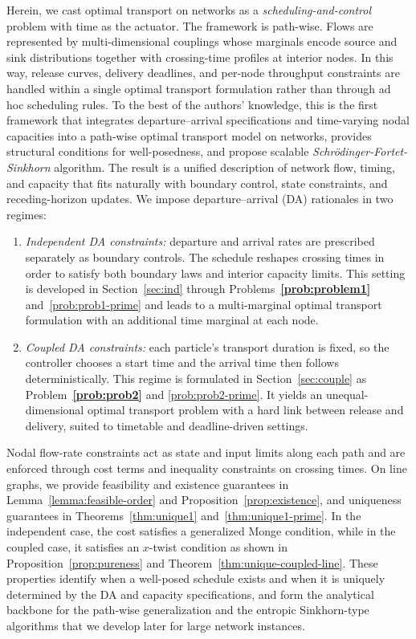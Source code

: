 \documentclass[11pt]{article}
\begin{document}
Herein, we cast optimal transport on networks as a \emph{scheduling-and-control} problem with time as the actuator. The framework is path-wise. Flows are represented by multi-dimensional couplings whose marginals encode source and sink distributions together with crossing-time profiles at interior nodes. In this way, release curves, delivery deadlines, and per-node throughput constraints are handled within a single optimal transport formulation rather than through ad hoc scheduling rules. To the best of the authors’ knowledge, this is the first framework that integrates departure–arrival specifications and time-varying nodal capacities into a path-wise optimal transport model on networks, provides structural conditions for well-posedness, and propose scalable \emph{Schr\"odinger-Fortet-Sinkhorn} algorithm. The result is a unified description of network flow, timing, and capacity that fits naturally with boundary control, state constraints, and receding-horizon updates. We impose departure–arrival (DA) rationales in two regimes:
\begin{enumerate}
\item[i)] \emph{Independent DA constraints:} departure and arrival rates are prescribed separately as boundary controls. The schedule reshapes crossing times in order to satisfy both boundary laws and interior capacity limits. This setting is developed in Section~\ref{sec:ind} through Problems~{\bf \ref{prob:problem1}} and~\ref{prob:prob1-prime} and leads to a multi-marginal optimal transport formulation with an additional time marginal at each node.
\item[ii)] \emph{Coupled DA constraints:} each particle’s transport duration is fixed, so the controller chooses a start time and the arrival time then follows deterministically. This regime is formulated in Section~\ref{sec:couple} as Problem~{\bf \ref{prob:prob2}} and \ref{prob:prob2-prime}. It yields an unequal-dimensional optimal transport problem with a hard link between release and delivery, suited to timetable and deadline-driven settings.
\end{enumerate}
Nodal flow-rate constraints act as state and input limits along each path and are enforced through cost terms and inequality constraints on crossing times. On line graphs, we provide feasibility and existence guarantees in Lemma~\ref{lemma:feasible-order} and Proposition~\ref{prop:existence}, and uniqueness guarantees in Theorems~\ref{thm:unique1} and~\ref{thm:unique1-prime}. In the independent case, the cost satisfies a generalized Monge condition, while in the coupled case, it satisfies an $x$-twist condition as shown in Proposition~\ref{prop:pureness} and Theorem~\ref{thm:unique-coupled-line}. These properties identify when a well-posed schedule exists and when it is uniquely determined by the DA and capacity specifications, and form the analytical backbone for the path-wise generalization and the entropic Sinkhorn-type algorithms that we develop later for large network instances.
\end{document}
